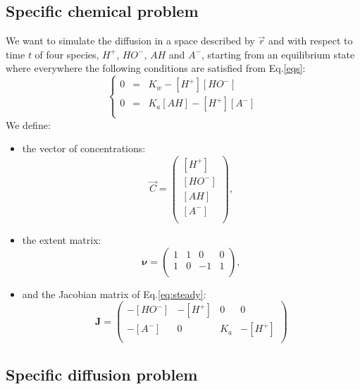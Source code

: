 \documentclass[aps,11pt]{revtex4}
\begin{document}
\subsection{Specific chemical problem}
We want to simulate the diffusion in a space described by $\vec{r}$ and with respect to time $t$ 
of four species, $H^+$, $HO^-$, $AH$ and $A^-$, starting from an equilibrium state where everywhere the following conditions are satisfied from Eq.\eqref{eqs}:
\begin{equation}
\label{eq:steady}
\left\lbrace
\begin{array}{rcl}
0 & = & K_w - [H^+]  [HO^-]\\
0 & = & K_a   [AH] - [H^+][A^-] \\
\end{array}
\right.
\end{equation}
We define:
\begin{itemize}
\item the vector of concentrations:
\begin{equation}
\vec{C} = 
\begin{pmatrix}
[H^+]\\
[HO^-]\\
[AH]\\
[A^-]\\
\end{pmatrix},
\end{equation}

\item the extent matrix:
\begin{equation}
	\bm{\nu} = 
	\begin{pmatrix}
	1 & 1 & 0 & 0 \\
	1 & 0 & -1 & 1\\
	\end{pmatrix},
\end{equation}

\item and the Jacobian matrix of Eq.\ref{eq:steady}:
\begin{equation}
	\bm{J} = 
	\begin{pmatrix}
	-[HO^-] & -[H^+] & 0 & 0 \\
	-[A^-] & 0 & K_a & -[H^+]\\
	\end{pmatrix}
\end{equation}

\end{itemize}

\subsection{Specific diffusion problem}
\end{document}
